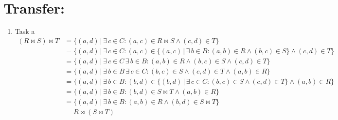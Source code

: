     \section*{Transfer:}
    \begin{enumerate}[label=(\alph*)]
    	\item Task a
        \begin{align*}
            (R \Join S) \Join T &= \{(a,d) \, | \, \exists\, c \in C : (a,c) \in R \Join S \land (c,d) \in T \}\\
            &=\{(a,d) \, | \, \exists\, c \in C : (a,c) \in \{(a,c) \,|\, \exists\, b \in B : (a,b) \in R \land (b,c) 
            \in S \}  \land (c,d) \in T \}\\
            &=\{(a,d) \, | \, \exists\, c \in C \, \exists\, b \in B : (a,b) \in R \land (b,c) \in S   \land (c,d) \in T \}\\
            &=\{(a,d) \, |  \, \exists\, b \in B \, \exists\, c \in C :  (b,c) \in S   \land (c,d) \in T \land (a,b) 
            \in R  \}\\
            &=\{(a,d) \, |  \, \exists\, b \in B : (b,d) \in \{(b,d) \,|\, \exists\, c \in C :  (b,c) \in S   
            \land (c,d) \in T\} \land (a,b) \in R  \}\\
            &=\{(a,d) \, |  \, \exists\, b \in B : (b,d) \in S\Join T \land (a,b) \in R  \}\\
            &=\{(a,d) \, |  \, \exists\, b \in B : (a,b) \in R \land (b,d) \in S\Join T  \}\\
            &=R \Join (S \Join T)
        \end{align*}
    \end{enumerate}







